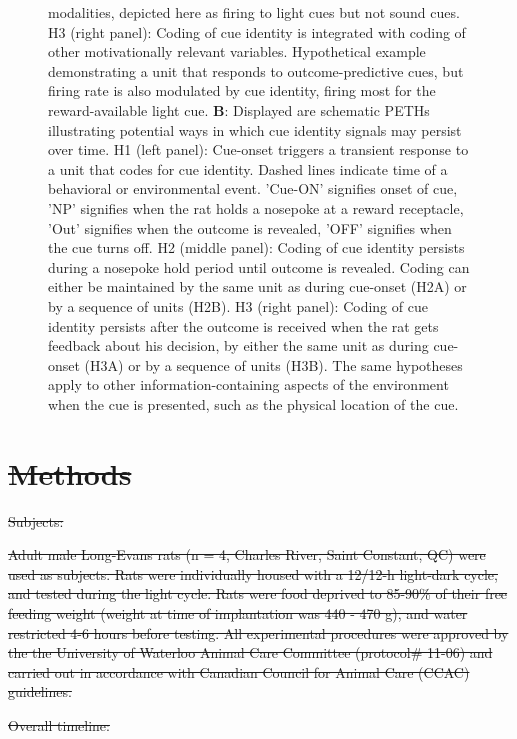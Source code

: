 \documentclass[11pt]{article}
\newcommand{\bsf}[1]{\textbf{#1}}
\providecommand{\DIFdel}[1]{{\protect\color{red}\sout{#1}}}                      %
\providecommand{\DIFdelbegin}{} %
\newcommand{\DIFscaledelfig}{0.5}
\newlength{\DIFdelgraphicswidth} %
\newlength{\DIFdelgraphicsheight} %
\newcommand{\DIFdelincludegraphics}[2][]{%
\sbox{\DIFdelgraphicsbox}{\DIFOincludegraphics[#1]{#2}}%
\settoboxwidth{\DIFdelgraphicswidth}{\DIFdelgraphicsbox} %
\settoboxtotalheight{\DIFdelgraphicsheight}{\DIFdelgraphicsbox} %
\scalebox{\DIFscaledelfig}{%
\parbox[b]{\DIFdelgraphicswidth}{\usebox{\DIFdelgraphicsbox}\\[-\baselineskip] \rule{\DIFdelgraphicswidth}{0em}}\llap{\resizebox{\DIFdelgraphicswidth}{\DIFdelgraphicsheight}{%
\setlength{\unitlength}{\DIFdelgraphicswidth}%
\begin{picture}(1,1)%
\thicklines\linethickness{2pt} %
{\color[rgb]{1,0,0}\put(0,0){\framebox(1,1){}}}%
{\color[rgb]{1,0,0}\put(0,0){\line( 1,1){1}}}%
{\color[rgb]{1,0,0}\put(0,1){\line(1,-1){1}}}%
\end{picture}%
}\hspace*{3pt}}} %
} %
\DeclareRobustCommand{\DIFdelbegin}{\DIFOdelbegin \let\includegraphics\DIFdelincludegraphics} %
\begin{document}
\begin{figure}
{  modalities, depicted here as firing to light cues but not sound
  cues. H3 (right panel): Coding of cue identity is integrated with
  coding of other motivationally relevant variables. Hypothetical
  example demonstrating a unit that responds to outcome-predictive
  cues, but firing rate is also modulated by cue identity, firing most
  for the reward-available light cue. \bsf{B}: Displayed are schematic
  PETHs illustrating potential ways in which cue identity signals may
  persist over time. H1 (left panel): Cue-onset triggers a transient
  response to a unit that codes for cue identity. Dashed lines
  indicate time of a behavioral or environmental event. 'Cue-ON'
  signifies onset of cue, 'NP' signifies when the rat holds a nosepoke
  at a reward receptacle, 'Out' signifies when the outcome is
  revealed, 'OFF' signifies when the cue turns off. H2 (middle
  panel): Coding of cue identity persists during a nosepoke hold
  period until outcome is revealed. Coding can either be maintained by
  the same unit as during cue-onset (H2A) or by a sequence of units
  (H2B). H3 (right panel): Coding of cue identity persists after the outcome is received when the rat gets feedback about his decision,
  by either the same unit as during cue-onset (H3A) or by a sequence of units (H3B). The
  same hypotheses apply to other information-containing aspects of the
  environment when the cue is presented, such as the physical location
  of the cue.}
\label{fig:schematic}

\end{figure}
\DIFdelbegin \section*{\DIFdel{Methods}}

\DIFdel{Subjects:}%

\DIFdel{Adult male Long-Evans rats (n = 4, Charles River, Saint Constant, QC)
were used as subjects. Rats were individually housed with a 12/12-h
light-dark cycle, and tested during the light cycle. Rats were food
deprived to 85-90\% of their free feeding weight (weight at time of
implantation was 440 - 470 g), and water restricted 4-6 hours before
testing. All experimental procedures were approved by the the
University of Waterloo Animal Care Committee (protocol\# 11-06) and
carried out in accordance with Canadian Council for Animal Care (CCAC)
guidelines.
}%

\DIFdel{Overall timeline:}%
\end{document}
